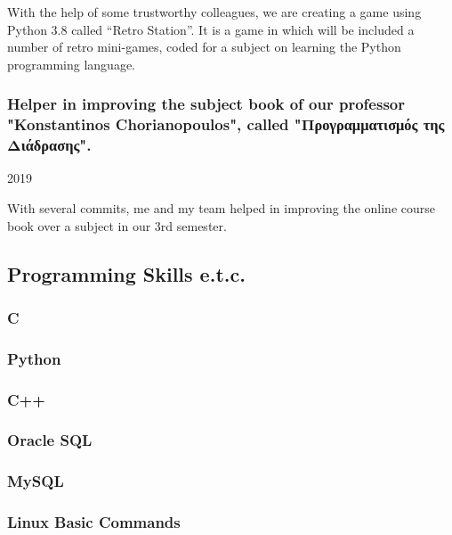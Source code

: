 \documentclass[english,]{article}
\begin{document}
With the help of some trustworthy colleagues, we are creating a game
using Python 3.8 called ``Retro Station''. It is a game in which will be
included a number of retro mini-games, coded for a subject on learning
the Python programming language.

\hypertarget{helper-in-improving-the-subject-book-of-our-professor-konstantinos-chorianopoulos-called-ux3c0ux3c1ux3bfux3b3ux3c1ux3b1ux3bcux3bcux3b1ux3c4ux3b9ux3c3ux3bcux3ccux3c2-ux3c4ux3b7ux3c2-ux3b4ux3b9ux3acux3b4ux3c1ux3b1ux3c3ux3b7ux3c2.}{%
\subsubsection{Helper in improving the subject book of our professor
"Konstantinos Chorianopoulos", called "Προγραμματισμός της
Διάδρασης".}\label{helper-in-improving-the-subject-book-of-our-professor-konstantinos-chorianopoulos-called-ux3c0ux3c1ux3bfux3b3ux3c1ux3b1ux3bcux3bcux3b1ux3c4ux3b9ux3c3ux3bcux3ccux3c2-ux3c4ux3b7ux3c2-ux3b4ux3b9ux3acux3b4ux3c1ux3b1ux3c3ux3b7ux3c2.}}

2019

With several commits, me and my team helped in improving the online
course book over a subject in our 3rd semester.

\hypertarget{programming-skills-e.t.c.}{%
\subsection{\texorpdfstring{{ \emph{} \emph{} } Programming Skills
e.t.c.}{    Programming Skills e.t.c.}}\label{programming-skills-e.t.c.}}

\hypertarget{c}{%
\subsubsection{C}\label{c}}

\hypertarget{python}{%
\subsubsection{Python}\label{python}}

\hypertarget{c-1}{%
\subsubsection{C++}\label{c-1}}

\hypertarget{oracle-sql}{%
\subsubsection{Oracle SQL}\label{oracle-sql}}

\hypertarget{mysql}{%
\subsubsection{MySQL}\label{mysql}}

\hypertarget{linux-basic-commands}{%
\subsubsection{Linux Basic Commands}\label{linux-basic-commands}}

{}
\end{document}
